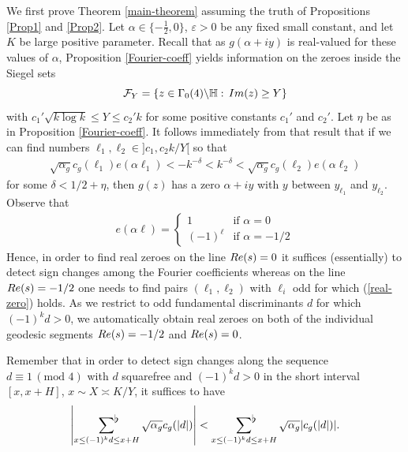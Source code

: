\documentclass[a4paper,10pt,twoside]{amsart}
\theoremstyle{definition}
\numberwithin{equation}{section}
\renewcommand{\Re}{\textnormal{Re}}
\renewcommand{\Im}{\textnormal{Im}}
\renewcommand\:{\colon}
\newcommand{\sumflat}{\mathop{{\sum}^{\raisebox{-3pt}{\makebox[0pt][l]{$\flat$}}}}}
\begin{document}
\noindent We first prove Theorem \ref{main-theorem} assuming the truth of Propositions \ref{Prop1} and \ref{Prop2}. Let $\alpha\in\{-\frac12,0\}$, $\varepsilon>0$ be any fixed small constant, and let $K$ be large positive parameter. Recall that as $g(\alpha+iy)$ is real-valued for these values of $\alpha$, Proposition \ref{Fourier-coeff} yields information on the zeroes inside the Siegel sets
\[\mathcal F_Y=\{z\in\Gamma_0(4)\backslash\mathbb H:\, \Im(z)\geq Y\}\]
with $c_1'\sqrt{k\log k}\leq Y\leq c_2'k$ for some positive constants $c_1'$ and $c_2'$. Let $\eta$ be as in Proposition \ref{Fourier-coeff}. It follows immediately from that result that if we can find numbers $\ell_1,\ell_2\in]c_1,c_2k/Y[$ so that 
\begin{align}\label{real-zero}
\sqrt{\alpha_g}c_g(\ell_1)e(\alpha\ell_1)<-k^{-\delta}<k^{-\delta}<\sqrt{\alpha_g}c_g(\ell_2)e(\alpha\ell_2)
\end{align}
for some $\delta<1/2+\eta$, then $g(z)$ has a zero $\alpha+iy$ with $y$ between $y_{\ell_1}$ and $y_{\ell_2}$. Observe that 
\begin{align*}
e(\alpha\ell)=\begin{cases}
1 & \text{if }\alpha=0\\
(-1)^\ell & \text{if }\alpha=-1/2
\end{cases}
\end{align*}
Hence, in order to find real zeroes on the line $\Re(s)=0$ it suffices (essentially) to detect sign changes among the Fourier coefficients whereas on the line $\Re(s)=-1/2$ one needs to find pairs $(\ell_1,\ell_2)$ with $\ell_i$ odd for which (\ref{real-zero}) holds. As we restrict to odd fundamental discriminants $d$ for which $(-1)^k d>0$, we automatically obtain real zeroes on both of the individual geodesic segments $\Re(s)=-1/2$ and $\Re(s)=0$. 

Remember that in order to detect sign changes along the sequence $d\equiv 1\,(\text{mod }4)$ with $d$ squarefree and $(-1)^kd>0$ in the short interval $[x,x+H]$, $x\sim X\asymp K/Y$, it suffices to have
\[\left|\sumflat_{x\leq (-1)^kd\leq x+H}\sqrt{\alpha_g}c_g(|d|)\right|<\sumflat_{x\leq (-1)^kd\leq x+H}\sqrt{\alpha_g}|c_g(|d|)|.\]
\end{document}
